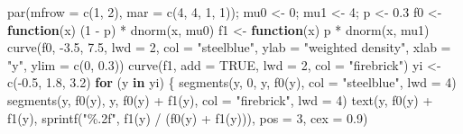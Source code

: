 \documentclass[
  letterpaper,
  DIV=11,
  numbers=noendperiod]{scrreprt}
\newenvironment{Shaded}{\begin{snugshade}}{\end{snugshade}}
\newcommand{\AttributeTok}[1]{\textcolor[rgb]{0.40,0.45,0.13}{#1}}
\newcommand{\ConstantTok}[1]{\textcolor[rgb]{0.56,0.35,0.01}{#1}}
\newcommand{\ControlFlowTok}[1]{\textcolor[rgb]{0.00,0.23,0.31}{\textbf{#1}}}
\newcommand{\DecValTok}[1]{\textcolor[rgb]{0.68,0.00,0.00}{#1}}
\newcommand{\FloatTok}[1]{\textcolor[rgb]{0.68,0.00,0.00}{#1}}
\newcommand{\FunctionTok}[1]{\textcolor[rgb]{0.28,0.35,0.67}{#1}}
\newcommand{\NormalTok}[1]{\textcolor[rgb]{0.00,0.23,0.31}{#1}}
\newcommand{\OtherTok}[1]{\textcolor[rgb]{0.00,0.23,0.31}{#1}}
\newcommand{\SpecialCharTok}[1]{\textcolor[rgb]{0.37,0.37,0.37}{#1}}
\newcommand{\StringTok}[1]{\textcolor[rgb]{0.13,0.47,0.30}{#1}}
\begin{document}
\begin{Shaded}
\begin{Highlighting}[]
\FunctionTok{par}\NormalTok{(}\AttributeTok{mfrow =} \FunctionTok{c}\NormalTok{(}\DecValTok{1}\NormalTok{, }\DecValTok{2}\NormalTok{), }\AttributeTok{mar =} \FunctionTok{c}\NormalTok{(}\DecValTok{4}\NormalTok{, }\DecValTok{4}\NormalTok{, }\DecValTok{1}\NormalTok{, }\DecValTok{1}\NormalTok{)); mu0 }\OtherTok{\textless{}{-}} \DecValTok{0}\NormalTok{; mu1 }\OtherTok{\textless{}{-}} \DecValTok{4}\NormalTok{; p }\OtherTok{\textless{}{-}} \FloatTok{0.3}
\NormalTok{f0 }\OtherTok{\textless{}{-}} \ControlFlowTok{function}\NormalTok{(x) (}\DecValTok{1} \SpecialCharTok{{-}}\NormalTok{ p) }\SpecialCharTok{*} \FunctionTok{dnorm}\NormalTok{(x, mu0)}
\NormalTok{f1 }\OtherTok{\textless{}{-}} \ControlFlowTok{function}\NormalTok{(x) p }\SpecialCharTok{*} \FunctionTok{dnorm}\NormalTok{(x, mu1)}
\FunctionTok{curve}\NormalTok{(f0, }\SpecialCharTok{{-}}\FloatTok{3.5}\NormalTok{, }\FloatTok{7.5}\NormalTok{, }\AttributeTok{lwd =} \DecValTok{2}\NormalTok{, }\AttributeTok{col =} \StringTok{"steelblue"}\NormalTok{, }\AttributeTok{ylab =} \StringTok{"weighted density"}\NormalTok{,}
      \AttributeTok{xlab =} \StringTok{"y"}\NormalTok{, }\AttributeTok{ylim =} \FunctionTok{c}\NormalTok{(}\DecValTok{0}\NormalTok{, }\FloatTok{0.3}\NormalTok{))}
\FunctionTok{curve}\NormalTok{(f1, }\AttributeTok{add =} \ConstantTok{TRUE}\NormalTok{, }\AttributeTok{lwd =} \DecValTok{2}\NormalTok{, }\AttributeTok{col =} \StringTok{"firebrick"}\NormalTok{)}
\NormalTok{yi }\OtherTok{\textless{}{-}} \FunctionTok{c}\NormalTok{(}\SpecialCharTok{{-}}\FloatTok{0.5}\NormalTok{, }\FloatTok{1.8}\NormalTok{, }\FloatTok{3.2}\NormalTok{)}
\ControlFlowTok{for}\NormalTok{ (y }\ControlFlowTok{in}\NormalTok{ yi) \{}
  \FunctionTok{segments}\NormalTok{(y, }\DecValTok{0}\NormalTok{, y, }\FunctionTok{f0}\NormalTok{(y), }\AttributeTok{col =} \StringTok{"steelblue"}\NormalTok{, }\AttributeTok{lwd =} \DecValTok{4}\NormalTok{)}
  \FunctionTok{segments}\NormalTok{(y, }\FunctionTok{f0}\NormalTok{(y), y, }\FunctionTok{f0}\NormalTok{(y) }\SpecialCharTok{+} \FunctionTok{f1}\NormalTok{(y), }\AttributeTok{col =} \StringTok{"firebrick"}\NormalTok{, }\AttributeTok{lwd =} \DecValTok{4}\NormalTok{)}
  \FunctionTok{text}\NormalTok{(y, }\FunctionTok{f0}\NormalTok{(y) }\SpecialCharTok{+} \FunctionTok{f1}\NormalTok{(y), }\FunctionTok{sprintf}\NormalTok{(}\StringTok{"\%.2f"}\NormalTok{, }\FunctionTok{f1}\NormalTok{(y) }\SpecialCharTok{/}\NormalTok{ (}\FunctionTok{f0}\NormalTok{(y) }\SpecialCharTok{+} \FunctionTok{f1}\NormalTok{(y))), }\AttributeTok{pos =} \DecValTok{3}\NormalTok{, }\AttributeTok{cex =} \FloatTok{0.9}\NormalTok{)}

\end{Highlighting}
\end{Shaded}
\end{document}
